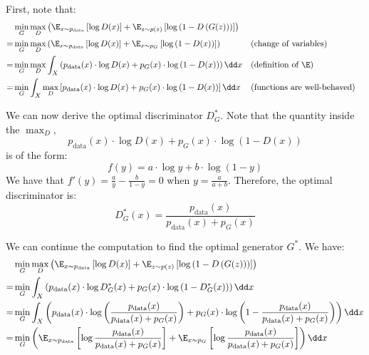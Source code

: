 First, note that:
\begin{align*}
    &\min_G\max_D \left(
        \E_{x\sim p_{\text{data}}}\left[\log D(x)\right] + \E_{z\sim p(z)}\left[\log\left(1-D\left(G(z)\right)\right)\right]
    \right) \\
    = &\min_G\max_D \left(
        \E_{x\sim p_{\text{data}}}\left[\log D(x)\right] + \E_{x\sim p_G}\left[\log\left(1-D(x)\right)\right]
    \right) && \text{(change of variables)} \\
    = &\min_G\max_D
        \int_X \left( p_{\text{data}}(x)\cdot\log D(x) + p_G(x)\cdot\log\left(1-D(x)\right) \right) \dd x
     && \text{(definition of $\E$)} \\
    = &\min_G
        \int_X \max_D \left[ p_{\text{data}}(x)\cdot\log D(x) + p_G(x)\cdot\log\left(1-D(x)\right) \right] \dd x
     && \text{(functions are well-behaved)} \\
\end{align*}

We can now derive the optimal discriminator $D_G^*$. Note that the quantity inside the $\max_D$,
\begin{equation*}
    p_{\text{data}}(x)\cdot\log D(x) + p_G(x)\cdot\log\left(1-D(x)\right)
\end{equation*}
is of the form:
\begin{equation*}
    f(y) = a\cdot\log y + b\cdot\log(1-y)
\end{equation*}
We have that $f'(y) = \frac{a}{y} - \frac{b}{1-y} = 0$ when $y = \frac{a}{a+b}$. Therefore, the optimal discriminator is:
\begin{equation*}
    D_G^*(x) = \frac{p_{\text{data}}(x)}{p_{\text{data}}(x) + p_G(x)}
\end{equation*}

We can continue the computation to find the optimal generator $G^*$. We have:
\begin{align*}
    &\min_G\max_D \left(
        \E_{x\sim p_{\text{data}}}\left[\log D(x)\right] + \E_{z\sim p(z)}\left[\log\left(1-D\left(G(z)\right)\right)\right]
    \right) \\
    = &\min_G
        \int_X \left( p_{\text{data}}(x)\cdot\log D^*_G(x) + p_G(x)\cdot\log\left(1-D^*_G(x)\right) \right) \dd x \\
    = &\min_G
        \int_X \left( p_{\text{data}}(x)\cdot\log\left(\frac{p_{\text{data}}(x)}{p_{\text{data}}(x) + p_G(x)}\right) + p_G(x)\cdot\log\left(1-\frac{p_{\text{data}}(x)}{p_{\text{data}}(x) + p_G(x)}\right) \right) \dd x \\
    = &\min_G
        \left( \E_{x\sim p_{\text{data}}}\left[\log\frac{p_{\text{data}}(x)}{p_{\text{data}}(x) + p_G(x)}\right] + \E_{x\sim p_G}\left[\log \frac{p_{\text{data}}(x)}{p_{\text{data}}(x) + p_G(x)}\right] \right) \dd x \\
\end{align*}

\newpage